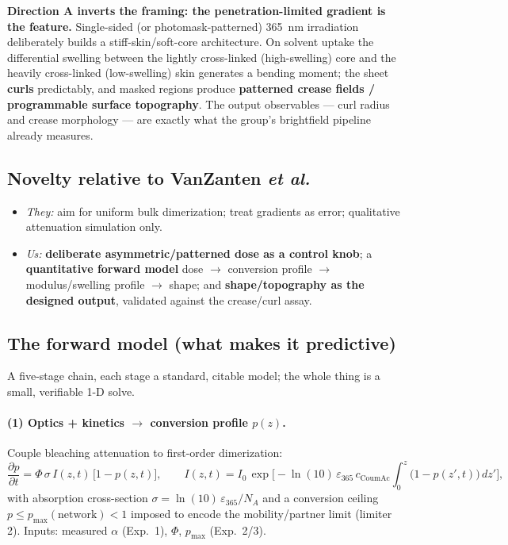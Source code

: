 \documentclass[11pt]{article}
\newcommand{\eps}{\varepsilon_{365}}
\newcommand{\Coum}{\text{CoumAc}}
\begin{document}
\textbf{Direction A inverts the framing: the penetration-limited gradient is the feature.}
Single-sided (or photomask-patterned) \SI{365}{nm} irradiation deliberately builds a
stiff-skin/soft-core architecture. On solvent uptake the differential swelling between the
lightly cross-linked (high-swelling) core and the heavily cross-linked (low-swelling) skin
generates a bending moment; the sheet \textbf{curls} predictably, and masked regions produce
\textbf{patterned crease fields / programmable surface topography}. The output observables
--- curl radius and crease morphology --- are exactly what the group's brightfield pipeline
already measures.

\subsection{Novelty relative to VanZanten \emph{et al.}\ \cite{vanzanten2026}}
\begin{itemize}[leftmargin=*]
  \item \emph{They:} aim for uniform bulk dimerization; treat gradients as error; qualitative
  attenuation simulation only.
  \item \emph{Us:} \textbf{deliberate asymmetric/patterned dose as a control knob}; a
  \textbf{quantitative forward model} dose $\to$ conversion profile $\to$ modulus/swelling
  profile $\to$ shape; and \textbf{shape/topography as the designed output}, validated
  against the crease/curl assay.
\end{itemize}

\subsection{The forward model (what makes it predictive)}
A five-stage chain, each stage a standard, citable model; the whole thing is a small,
verifiable 1-D solve.

\paragraph{(1) Optics + kinetics $\to$ conversion profile $p(z)$.}
Couple bleaching attenuation to first-order dimerization:
\begin{equation}
  \frac{\partial p}{\partial t} = \Phi\,\sigma\, I(z,t)\,\big[1-p(z,t)\big],
  \qquad
  I(z,t) = I_0\,\exp\!\Big[-\ln(10)\,\eps\, c_{\Coum}\!\int_0^z\!\big(1-p(z',t)\big)\,dz'\Big],
  \label{eq:model}
\end{equation}
with absorption cross-section $\sigma = \ln(10)\,\eps/N_A$ and a conversion ceiling
$p \le p_\text{max}(\text{network})<1$ imposed to encode the mobility/partner limit
(limiter 2). Inputs: measured $\alpha$ (Exp.~1), $\Phi$, $p_\text{max}$ (Exp.~2/3).
\end{document}
